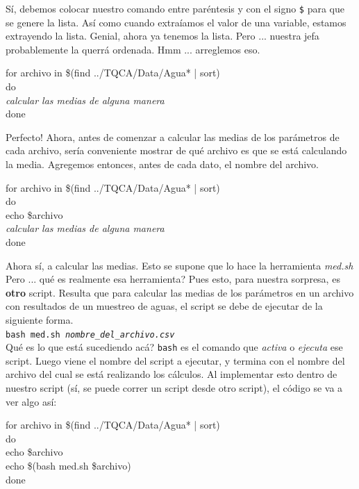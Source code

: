 \documentclass[10pt,letterpaper]{article}
\newcommand{\inlinecode}[1]{
\colorbox{light-gray}{\texttt{#1}}
}
\newenvironment{Code}
{
\begin{lrbox}{\selvestebox}%
\begin{minipage}{\dimexpr\columnwidth-2\fboxsep\relax}
\fontfamily{\ttdefault}\selectfont
}
{\end{minipage}\end{lrbox}%
\begin{center}
\colorbox{light-gray}{\usebox{\selvestebox}}
\end{center}
}
\begin{document}
S\'i, debemos colocar nuestro comando entre par\'entesis y con el signo \inlinecode{\$} para que se genere la lista. As\'i como cuando extra\'iamos el valor de una variable, estamos extrayendo la lista. Genial, ahora ya tenemos la lista. Pero ... nuestra jefa probablemente la querr\'a ordenada. Hmm ... arreglemos eso.

\begin{Code}
for archivo in \$(find ../TQCA/Data/Agua* | sort)\\
do\\
\emph{calcular las medias de alguna manera}\\
done
\end{Code}

Perfecto! Ahora, antes de comenzar a calcular las medias de los par\'ametros de cada archivo, ser\'ia conveniente mostrar de qu\'e archivo es que se est\'a calculando la media. Agregemos entonces, antes de cada dato, el nombre del archivo.

\begin{Code}
for archivo in \$(find ../TQCA/Data/Agua* | sort)\\
do\\
echo \$archivo\\
\emph{calcular las medias de alguna manera}\\
done
\end{Code}

Ahora s\'i, a calcular las medias. Esto se supone que lo hace la herramienta \emph{med.sh} Pero ... qu\'e es realmente esa herramienta? Pues esto, para nuestra sorpresa, es \textbf{otro} script. Resulta que para calcular las medias de los par\'ametros en un archivo con resultados de un muestreo de aguas, el script se debe de ejecutar de la siguiente forma.\\
\inlinecode{bash med.sh \emph{nombre\_del\_archivo.csv}}\\

Qu\'e es lo que est\'a sucediendo ac\'a? \inlinecode{bash} es el comando que \emph{activa} o \emph{ejecuta} ese script. Luego viene el nombre del script a ejecutar, y termina con el nombre del archivo del cual se est\'a realizando los c\'alculos. Al implementar esto dentro de nuestro script (s\'i, se puede correr un script desde otro script), el c\'odigo se va a ver algo as\'i:

\begin{Code}
for archivo in \$(find ../TQCA/Data/Agua* | sort)\\
do\\
echo \$archivo\\
echo \$(bash med.sh \$archivo)\\
done
\end{Code}
\end{document}
